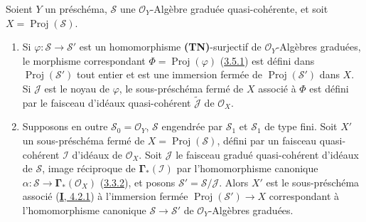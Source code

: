 \begin{proposition}[3.6.2]
\label{II.3.6.2-fr}
Soient $Y$ un préschéma, $\mathcal{S}$ une $\mathcal{O}_Y$-Algèbre graduée
quasi-cohérente, et soit $X=\operatorname{Proj}(\mathcal{S})$.
\begin{enumerate}
  \item[\rm(i)] Si $\varphi:\mathcal{S}\to\mathcal{S}'$ est un
    homomorphisme \textup{\textbf{(TN)}}-surjectif de $\mathcal{O}_Y$-Algèbres
    graduées, le morphisme correspondant
    $\Phi=\operatorname{Proj}(\varphi)$
    \textup{(\hyperref[II.3.5.1-fr]{3.5.1})} est défini dans
    $\operatorname{Proj}(\mathcal{S}')$ tout entier et est une immersion
    fermée de $\operatorname{Proj}(\mathcal{S}')$ dans $X$. Si $\mathcal{J}$
    est le noyau de $\varphi$, le sous-préschéma fermé de $X$ associé à
    $\Phi$ est défini par le faisceau d'idéaux quasi-cohérent
    $\widetilde{\mathcal{J}}$ de $\mathcal{O}_X$.
  \item[\rm(ii)] Supposons en outre $\mathcal{S}_0=\mathcal{O}_Y$,
    $\mathcal{S}$ engendrée par $\mathcal{S}_1$ et $\mathcal{S}_1$ de type
    fini. Soit $X'$ un sous-préschéma fermé de
    $X=\operatorname{Proj}(\mathcal{S})$, défini par un faisceau
    quasi-cohérent $\mathcal{I}$ d'idéaux de $\mathcal{O}_X$. Soit
    $\mathcal{J}$
    le faisceau gradué quasi-cohérent d'idéaux de $\mathcal{S}$, image
    réciproque de $\mathbf{\Gamma}_*(\mathcal{I})$ par l'homomorphisme canonique
    $\alpha:\mathcal{S}\to\mathbf{\Gamma}_*(\mathcal{O}_X)$
    \textup{(\hyperref[II.3.3.2-fr]{3.3.2})}, et posons
    $\mathcal{S}'=\mathcal{S}/\mathcal{J}$. Alors $X'$ est le sous-préschéma
    associé \textup{(\hyperref[I.4.2.1-fr]{\textbf{I}, 4.2.1})} à l'immersion fermée
    $\operatorname{Proj}(\mathcal{S}')\to X$ correspondant à l'homomorphisme
    canonique $\mathcal{S}\to\mathcal{S}'$ de $\mathcal{O}_Y$-Algèbres
    graduées.
\end{enumerate}
\end{proposition}

